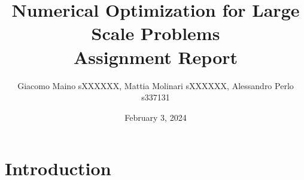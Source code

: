 \documentclass{article}
\title{Numerical Optimization for Large Scale Problems\\
\Large Assignment Report}
\author{Giacomo Maino sXXXXXX, Mattia Molinari sXXXXXX, Alessandro Perlo s337131}
\date{February 3, 2024}
\begin{document}
\maketitle

\section{Introduction}
\end{document}
